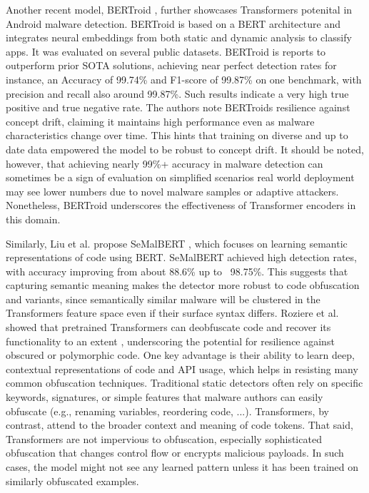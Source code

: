 Another recent model, BERTroid 
\cite{bertroid}
, further showcases Transformers potenital in Android malware detection. 
BERTroid is based on a BERT architecture and integrates neural embeddings from both static and dynamic 
analysis to classify apps. 
It was evaluated on several public datasets. 
BERTroid is reports to outperform prior SOTA solutions, achieving near perfect detection rates 
for instance, an Accuracy of 99.74\% and F1-score of 99.87\% on one benchmark, 
with precision and recall also around 99.87\%. 
Such results indicate a very high true positive and true negative rate. 
The authors note BERTroids resilience against concept drift, 
claiming it maintains high performance even as malware characteristics change over time. 
This hints that training on diverse and up to date data empowered the model to be robust to concept drift. 
It should be noted, however, that achieving nearly 99\%+ 
accuracy in malware detection can sometimes be a sign of evaluation on simplified scenarios 
real world deployment may see lower numbers due to novel malware samples or adaptive attackers. 
Nonetheless, BERTroid underscores the effectiveness of Transformer encoders in this domain. 

Similarly, Liu et al. propose SeMalBERT 
\cite{semalbert}
, which focuses on learning semantic representations of code using BERT. 
SeMalBERT achieved high detection rates, with accuracy improving from about 88.6\% up to ~98.75\%. 
This suggests that capturing semantic meaning makes the detector more robust to code obfuscation 
and variants, since semantically similar malware will be clustered in the Transformers feature space 
even if their surface syntax differs. 
Roziere et al. showed that pretrained Transformers can deobfuscate code and 
recover its functionality to an extent 
\cite{deobfuscation}
, underscoring the potential for resilience against obscured or polymorphic code. 
One key advantage is their ability to learn deep, contextual representations of code and API usage, 
which helps in resisting many common obfuscation techniques. 
Traditional static detectors often rely on specific keywords, signatures, or simple features that 
malware authors can easily obfuscate (e.g., renaming variables, reordering code, ...).
Transformers, by contrast, attend to the broader context and meaning of code tokens.
That said, Transformers are not impervious to obfuscation, especially sophisticated obfuscation that 
changes control flow or encrypts malicious payloads. 
In such cases, the model might not see any learned pattern unless it has been trained on 
similarly obfuscated examples. 

